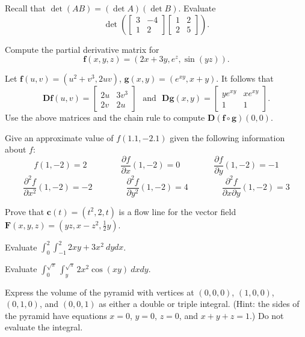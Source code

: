 \documentclass[12pt]{exam}
\newcommand{\vect}[1]{\ensuremath{\mathbf{#1}}}
\newcommand{\<}{(}
\renewcommand{\>}{)}
\newcommand{\p}{\partial}
\begin{document}
\begin{questions}

\question[15]
Recall that \(\det(AB)=(\det A)(\det B)\). Evaluate
\[
  \det\left(
    \left[
    \begin{matrix}
       3 &  -4 \\
       1 &  2
    \end{matrix}
    \right]
    \left[
    \begin{matrix}
       1 &  2 \\
       2 &  5
    \end{matrix}
    \right]
  \right)
.\]

\newpage

\question[15]
Compute the partial derivative matrix for
\[
  \vect f(x,y,z) = \<2x+3y,e^z,\sin(yz)\>
.\]

\newpage

\question[15]
Let \(\vect f(u,v)=\<u^2+v^3,2uv\>\),
\(\vect g(x,y)=\<e^{xy},x+y\>\). It follows that
\[
  \vect D\vect f(u,v)
    =
  \left[\begin{matrix}
    2u & 3v^3 \\
    2v & 2u
  \end{matrix}\right]
  \text{~~and~~}
  \vect D\vect g(x,y)
    =
  \left[\begin{matrix}
    ye^{xy} & xe^{xy} \\
    1 & 1
  \end{matrix}\right]
.\]
Use the above matrices and the chain rule to compute
\(\vect D(\vect f\circ\vect g)(0,0)\).

\newpage

\question[15]
Give an approximate value of \(f(1.1,-2.1)\) given the following
information about \(f\):
\[
  f(1,-2)=2
    \hspace{4em}
  \frac{\p f}{\p x}(1,-2)=0
    \hspace{4em}
  \frac{\p f}{\p y}(1,-2)=-1
\]
\[
  \frac{\p^2 f}{\p x^2}(1,-2)=-2
    \hspace{4em}
  \frac{\p^2 f}{\p y^2}(1,-2)=4
    \hspace{4em}
  \frac{\p^2 f}{\p x\p y}(1,-2)=3
\]

\newpage

\question[15]
Prove that \(\vect c(t)=\<t^2,2,t\>\) is a flow line for
the vector field \(\vect F(x,y,z)=\<yz,x-z^2,\frac{1}{2}y\>\).

\newpage

\question[15]
Evaluate \(\int_{0}^{2}\int_{-1}^{2} 2xy+3x^2 ~dydx\).

\newpage

\question[15]
Evaluate \(\int_{0}^{\sqrt\pi}\int_{y}^{\sqrt\pi} 2x^2\cos(xy) ~dxdy\).

\newpage
\question[15]
Express the volume of the pyramid with vertices at \((0,0,0)\),
\((1,0,0)\), \((0,1,0)\), and \((0,0,1)\) as either a double or
triple integral. (Hint: the sides of the pyramid have
equations \(x=0\), \(y=0\), \(z=0\), and \(x+y+z=1\).)
Do not evaluate the integral.

\end{questions}
\end{document}
